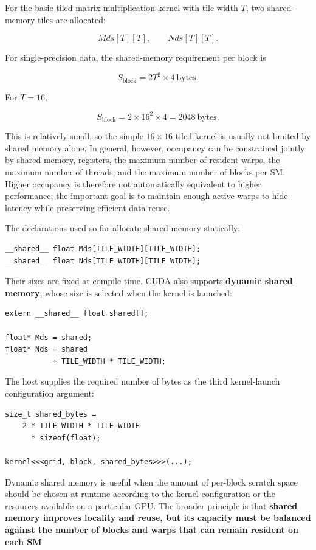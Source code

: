 \documentclass[11pt,a4paper]{article}
\begin{document}
For the basic tiled matrix-multiplication kernel with tile width $T$, two shared-memory tiles are allocated:

\[
Mds[T][T],
\qquad
Nds[T][T].
\]

For single-precision data, the shared-memory requirement per block is

\[
\boxed{
S_{\mathrm{block}}
=
2T^2\times 4\ \text{bytes}.
}
\]

For $T=16$,

\[
S_{\mathrm{block}}
=
2\times16^2\times4
=
2048\ \text{bytes}.
\]

This is relatively small, so the simple $16\times16$ tiled kernel is usually not limited by shared memory alone. In general, however, occupancy can be constrained jointly by shared memory, registers, the maximum number of resident warps, the maximum number of threads, and the maximum number of blocks per SM. Higher occupancy is therefore not automatically equivalent to higher performance; the important goal is to maintain enough active warps to hide latency while preserving efficient data reuse.

The declarations used so far allocate shared memory statically:

\begin{lstlisting}
__shared__ float Mds[TILE_WIDTH][TILE_WIDTH];
__shared__ float Nds[TILE_WIDTH][TILE_WIDTH];
\end{lstlisting}

Their sizes are fixed at compile time. CUDA also supports \textbf{dynamic shared memory}, whose size is selected when the kernel is launched:

\begin{lstlisting}
extern __shared__ float shared[];

float* Mds = shared;
float* Nds = shared
           + TILE_WIDTH * TILE_WIDTH;
\end{lstlisting}

The host supplies the required number of bytes as the third kernel-launch configuration argument:

\begin{lstlisting}
size_t shared_bytes =
    2 * TILE_WIDTH * TILE_WIDTH
      * sizeof(float);

kernel<<<grid, block, shared_bytes>>>(...);
\end{lstlisting}

Dynamic shared memory is useful when the amount of per-block scratch space should be chosen at runtime according to the kernel configuration or the resources available on a particular GPU. The broader principle is that \textbf{shared memory improves locality and reuse, but its capacity must be balanced against the number of blocks and warps that can remain resident on each SM}.
\end{document}
